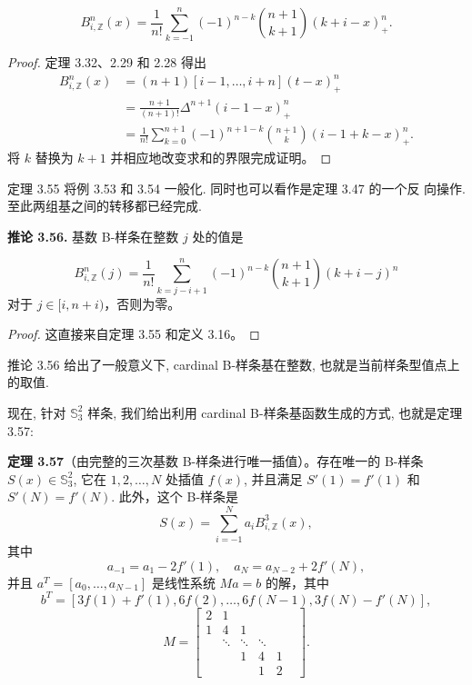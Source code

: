 \documentclass[a4paper]{ctexart}
\begin{document}
{\[ 
B_{i,\mathbb{Z}}^n(x) = \frac{1}{n!} \sum_{k=-1}^{n} (-1)^{n-k} \binom{n+1}{k+1} (k + i - x)_+^n. \tag{3.69}
\]

\begin{proof}
  定理 3.32、2.29 和 2.28 得出
\begin{align*}
B_{i,\mathbb{Z}}^n(x) &= (n + 1)[i-1, \ldots, i + n](t - x)_+^n \\
&= \frac{n + 1}{(n + 1)!} \Delta^{n+1} (i - 1 - x)_+^n \\
&= \frac{1}{n!} \sum_{k=0}^{n+1} (-1)^{n+1-k} \binom{n+1}{k} (i - 1 + k - x)_+^n.   
\end{align*}
将 $k$ 替换为 $k + 1$ 并相应地改变求和的界限完成证明。
\end{proof} 

定理 3.55 将例 3.53 和 3.54 一般化. 同时也可以看作是定理 3.47 的一个反
向操作. 至此两组基之间的转移都已经完成.

\noindent \textbf{推论 3.56.} 基数 B-样条在整数 $j$ 处的值是

\[ 
B_{i, \mathbb{Z}}^n(j) = \frac{1}{n!} \sum_{k=j-i+1}^{n} (-1)^{n-k} \binom{n+1}{k+1} (k+i-j)^n \tag{3.70}
\]
对于 $j \in [i, n+i)$，否则为零。

\begin{proof}
  这直接来自定理 3.55 和定义 3.16。  
\end{proof}

推论 3.56 给出了一般意义下, cardinal B-样条基在整数, 也就是当前样条型值点上的取值.

现在, 针对 $\mathbb{S}_3^2$ 样条, 我们给出利用 cardinal B-样条基函数生成的方式, 也就是定理 3.57:

\noindent \textbf{定理 3.57}（由完整的三次基数 B-样条进行唯一插值）。存在唯一的 B-样条 
$S(x) \in \mathbb{S}_{3}^{2}$, 它在 $1, 2, \ldots, N$ 处插值 $f(x)$, 并且满足 $S'(1) = f'(1)$ 和 $S'(N) = f'(N)$. 此外，这个 B-样条是
\[ 
S(x) = \sum_{i=-1}^N a_i B_{i, \mathbb{Z}}^3(x), \tag{3.71}
\]
其中
\[ 
a_{-1} = a_{1} - 2 f'(1), \quad a_{N} = a_{N-2} + 2 f'(N), \tag{3.72}
\]
并且 $a^T = [a_{0}, \ldots, a_{N-1}]$ 是线性系统 $Ma = b$ 的解，其中
\[
b^T = [3f(1) + f'(1), 6f(2), \ldots, 6f(N-1), 3f(N) - f'(N)], 
\]
\[ 
M = \begin{bmatrix} 2 & 1 & & & & \\ 1 & 4 & 1 & & \\ & \ddots & \ddots & \ddots & \\ & & 1 & 4 & 1 \\ & & & 1 & 2 \end{bmatrix}. 
\]

}
\end{document}
